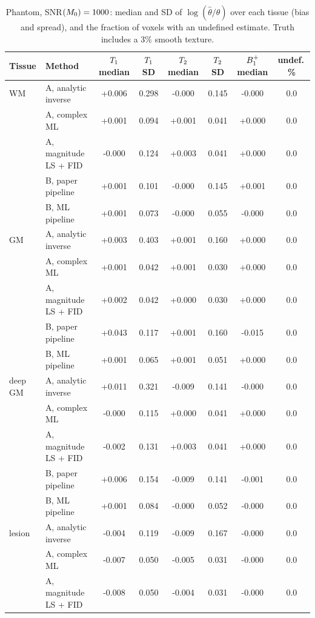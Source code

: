 \begin{table}[!htbp]
\centering
\caption{Phantom, SNR$(M_0)=1000$: median and SD of $\log(\hat\theta/\theta)$ over each tissue (bias and spread), and the fraction of voxels with an undefined estimate. Truth includes a $3\%$ smooth texture.}
\label{tab:roi1000}
\footnotesize
\setlength{\tabcolsep}{3.5pt}
\begin{tabular}{llcccccc}
\toprule
Tissue & Method & $T_1$ median & $T_1$ SD & $T_2$ median & $T_2$ SD & $B_1^{+}$ median & undef.\,\%\\
\midrule
WM & A, analytic inverse & +0.006 & 0.298 & -0.000 & 0.145 & -0.000 & 0.0\\
 & A, complex ML & +0.001 & 0.094 & +0.001 & 0.041 & +0.000 & 0.0\\
 & A, magnitude LS + FID & -0.000 & 0.124 & +0.003 & 0.041 & +0.000 & 0.0\\
 & B, paper pipeline & +0.001 & 0.101 & -0.000 & 0.145 & +0.001 & 0.0\\
 & B, ML pipeline & +0.001 & 0.073 & -0.000 & 0.055 & -0.000 & 0.0\\
\midrule
GM & A, analytic inverse & +0.003 & 0.403 & +0.001 & 0.160 & +0.000 & 0.0\\
 & A, complex ML & +0.001 & 0.042 & +0.001 & 0.030 & +0.000 & 0.0\\
 & A, magnitude LS + FID & +0.002 & 0.042 & +0.000 & 0.030 & +0.000 & 0.0\\
 & B, paper pipeline & +0.043 & 0.117 & +0.001 & 0.160 & -0.015 & 0.0\\
 & B, ML pipeline & +0.001 & 0.065 & +0.001 & 0.051 & +0.000 & 0.0\\
\midrule
deep GM & A, analytic inverse & +0.011 & 0.321 & -0.009 & 0.141 & -0.000 & 0.0\\
 & A, complex ML & -0.000 & 0.115 & +0.000 & 0.041 & +0.000 & 0.0\\
 & A, magnitude LS + FID & -0.002 & 0.131 & +0.003 & 0.041 & +0.000 & 0.0\\
 & B, paper pipeline & +0.006 & 0.154 & -0.009 & 0.141 & -0.001 & 0.0\\
 & B, ML pipeline & +0.001 & 0.084 & -0.000 & 0.052 & -0.000 & 0.0\\
\midrule
lesion & A, analytic inverse & -0.004 & 0.119 & -0.009 & 0.167 & -0.000 & 0.0\\
 & A, complex ML & -0.007 & 0.050 & -0.005 & 0.031 & -0.000 & 0.0\\
 & A, magnitude LS + FID & -0.008 & 0.050 & -0.004 & 0.031 & -0.000 & 0.0\\

\end{tabular}
\end{table}
